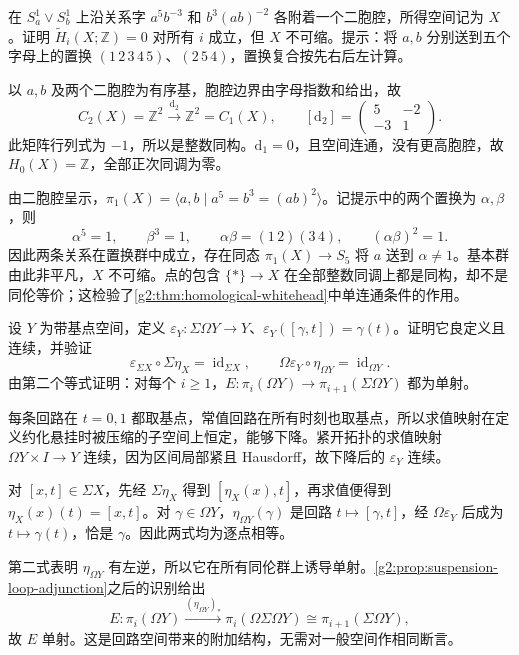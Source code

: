 \begin{exercise}\label{g2:ex:acyclic-noncontractible-cw}
	在 \(S^1_a\vee S^1_b\) 上沿关系字 \(a^5b^{-3}\) 和 \(b^3(ab)^{-2}\) 各附着一个二胞腔，所得空间记为 \(X\)。证明 \(\widetilde H_i(X;\mathbb Z)=0\) 对所有 \(i\) 成立，但 \(X\) 不可缩。提示：将 \(a,b\) 分别送到五个字母上的置换 \((1\,2\,3\,4\,5)\)、\((2\,5\,4)\)，置换复合按先右后左计算。
\end{exercise}
\begin{solution}
	以 \(a,b\) 及两个二胞腔为有序基，胞腔边界由字母指数和给出，故
	\[
		C_2(X)=\mathbb Z^2\xrightarrow{\mathrm d_2}\mathbb Z^2=C_1(X),\qquad
		[\mathrm d_2]=\begin{pmatrix}5&-2\\-3&1\end{pmatrix}.
	\]
	此矩阵行列式为 \(-1\)，所以是整数同构。\(\mathrm d_1=0\)，且空间连通，没有更高胞腔，故 \(H_0(X)=\mathbb Z\)，全部正次同调为零。

	由二胞腔呈示，\(\pi_1(X)=\langle a,b\mid a^5=b^3=(ab)^2\rangle\)。记提示中的两个置换为 \(\alpha,\beta\)，则
	\[
		\alpha^5=1,\qquad\beta^3=1,\qquad
		\alpha\beta=(1\,2)(3\,4),\qquad(\alpha\beta)^2=1.
	\]
	因此两条关系在置换群中成立，存在同态 \(\pi_1(X)\to S_5\) 将 \(a\) 送到 \(\alpha\ne1\)。基本群由此非平凡，\(X\) 不可缩。点的包含 \(\{*\}\to X\) 在全部整数同调上都是同构，却不是同伦等价；这检验了\cref{g2:thm:homological-whitehead}中单连通条件的作用。
\end{solution}

\begin{exercise}\label{g2:ex:suspension-adjunction-triangles}
	设 \(Y\) 为带基点空间，定义 \(\varepsilon_Y:\Sigma\Omega Y\rightarrow Y\)、\(\varepsilon_Y([\gamma,t])=\gamma(t)\)。证明它良定义且连续，并验证
	\[
		\varepsilon_{\Sigma X}\circ\Sigma\eta_X=\operatorname{id}_{\Sigma X},\qquad
		\Omega\varepsilon_Y\circ\eta_{\Omega Y}=\operatorname{id}_{\Omega Y}.
	\]
	由第二个等式证明：对每个 \(i\ge1\)，\(E:\pi_i(\Omega Y)\rightarrow\pi_{i+1}(\Sigma\Omega Y)\) 都为单射。
\end{exercise}
\begin{solution}
	每条回路在 \(t=0,1\) 都取基点，常值回路在所有时刻也取基点，所以求值映射在定义约化悬挂时被压缩的子空间上恒定，能够下降。紧开拓扑的求值映射 \(\Omega Y\times I\rightarrow Y\) 连续，因为区间局部紧且 Hausdorff，故下降后的 \(\varepsilon_Y\) 连续。

	对 \([x,t]\in\Sigma X\)，先经 \(\Sigma\eta_X\) 得到 \([\eta_X(x),t]\)，再求值便得到 \(\eta_X(x)(t)=[x,t]\)。对 \(\gamma\in\Omega Y\)，\(\eta_{\Omega Y}(\gamma)\) 是回路 \(t\mapsto[\gamma,t]\)，经 \(\Omega\varepsilon_Y\) 后成为 \(t\mapsto\gamma(t)\)，恰是 \(\gamma\)。因此两式均为逐点相等。

	第二式表明 \(\eta_{\Omega Y}\) 有左逆，所以它在所有同伦群上诱导单射。\cref{g2:prop:suspension-loop-adjunction}之后的识别给出
	\[
		E:\pi_i(\Omega Y)\xrightarrow{(\eta_{\Omega Y})_*}\pi_i(\Omega\Sigma\Omega Y)\cong\pi_{i+1}(\Sigma\Omega Y),
	\]
	故 \(E\) 单射。这是回路空间带来的附加结构，无需对一般空间作相同断言。
\end{solution}

